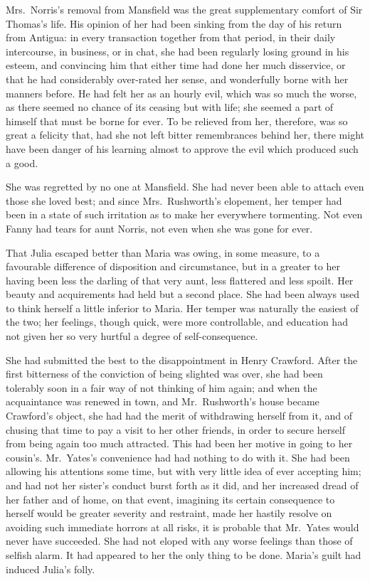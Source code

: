Mrs.\ Norris's removal from Mansfield was the great supplementary
comfort of Sir Thomas's life.  His opinion of her had
been sinking from the day of his return from Antigua:
in every transaction together from that period, in their
daily intercourse, in business, or in chat, she had been
regularly losing ground in his esteem, and convincing
him that either time had done her much disservice,
or that he had considerably over-rated her sense,
and wonderfully borne with her manners before.  He had
felt her as an hourly evil, which was so much the worse,
as there seemed no chance of its ceasing but with life;
she seemed a part of himself that must be borne for ever.
To be relieved from her, therefore, was so great a
felicity that, had she not left bitter remembrances
behind her, there might have been danger of his learning
almost to approve the evil which produced such a good.

She was regretted by no one at Mansfield.  She had never
been able to attach even those she loved best; and since
Mrs.\ Rushworth's elopement, her temper had been in a state
of such irritation as to make her everywhere tormenting.
Not even Fanny had tears for aunt Norris, not even when
she was gone for ever.

That Julia escaped better than Maria was owing, in some measure,
to a favourable difference of disposition and circumstance,
but in a greater to her having been less the darling
of that very aunt, less flattered and less spoilt.
Her beauty and acquirements had held but a second place.
She had been always used to think herself a little inferior
to Maria.  Her temper was naturally the easiest of the two;
her feelings, though quick, were more controllable,
and education had not given her so very hurtful a degree
of self-consequence.

She had submitted the best to the disappointment
in Henry Crawford.  After the first bitterness of the
conviction of being slighted was over, she had been
tolerably soon in a fair way of not thinking of him again;
and when the acquaintance was renewed in town,
and Mr.\ Rushworth's house became Crawford's object,
she had had the merit of withdrawing herself from it,
and of chusing that time to pay a visit to her other friends,
in order to secure herself from being again too much attracted.
This had been her motive in going to her cousin's.
Mr.\ Yates's convenience had had nothing to do with it.
She had been allowing his attentions some time,
but with very little idea of ever accepting him;
and had not her sister's conduct burst forth as it did,
and her increased dread of her father and of home,
on that event, imagining its certain consequence to herself
would be greater severity and restraint, made her hastily
resolve on avoiding such immediate horrors at all risks,
it is probable that Mr.\ Yates would never have succeeded.
She had not eloped with any worse feelings than those
of selfish alarm.  It had appeared to her the only
thing to be done.  Maria's guilt had induced Julia's folly.


